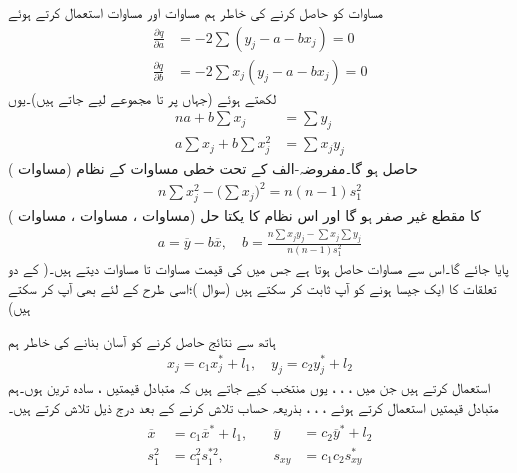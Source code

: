 مساوات  کو حاصل کرنے کی خاطر ہم مساوات  اور مساوات  استعمال کرتے ہوئے 
\begin{align*}
\frac{\partial q}{\partial a}&=-2\sum(y_j-a-bx_j)=0\\
\frac{\partial q}{\partial b}&=-2\sum x_j(y_j-a-bx_j)=0
\end{align*}
لکھتے ہوئے (جہاں  پر  تا  مجموعے لیے جاتے ہیں)۔یوں
\begin{align*}
na+b\sum x_j&=\sum y_j\\
a\sum x_j+b\sum x_j^2&=\sum x_jy_j
\end{align*}
حاصل ہو گا۔مفروضہ-الف کے تحت خطی مساوات کے نظام (مساوات )
\begin{align*}
n\sum x_j^2-\big(\sum x_j\big)^2=n(n-1)s_1^2
\end{align*}
کا مقطع غیر صفر ہو گا اور اس نظام کا یکتا حل (مساوات ، مساوات ، مساوات )
\begin{align}
a=\overline{y}-b\overline{x},\quad b=\frac{n\sum x_jy_j-\sum x_j\sum y_j}{n(n-1)s_1^2}
\end{align}
 پایا جائے گا۔اس سے مساوات  حاصل ہوتا ہے جس میں  کی قیمت مساوات  تا مساوات  دیتے ہیں۔( کے دو تعلقات کا ایک جیسا ہونے کو آپ ثابت کر سکتے ہیں (سوال )؛اسی طرح  کے لئے بھی آپ کر سکتے ہیں)

ہاتھ سے نتائج حاصل کرنے کو آسان بنانے کی خاطر ہم 
\begin{align}
x_j=c_1x_j^*+l_1,\quad y_j=c_2y_j^*+l_2
\end{align}
استعمال کرتے ہیں جن میں ، ، ،  یوں منتخب کیے جاتے ہیں کہ متبادل قیمتیں ،  سادہ ترین ہوں۔ہم متبادل قیمتیں استعمال کرتے ہوئے  ، ، ،  بذریعہ حساب تلاش کرنے کے بعد درج ذیل تلاش کرتے ہیں۔
\begin{gather}
\begin{aligned}
\overline{x}&=c_1\overline{x}^*+l_1,\\
s_1^2&=c_1^2s_1^{*2},
\end{aligned}
\quad 
\begin{aligned}
\overline{y}&=c_2\overline{y}^*+l_2\\
s_{xy}&=c_1c_2s_{xy}^*
\end{aligned}
\end{gather}

